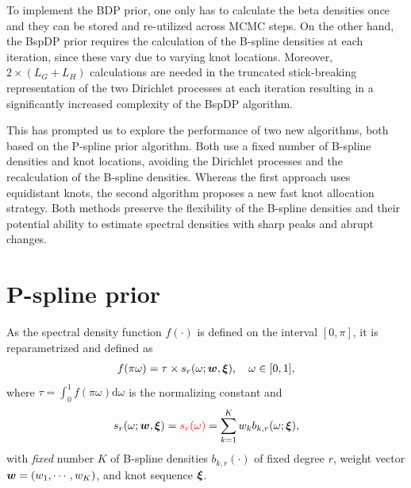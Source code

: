 \documentclass[twocolumn,final]{svjour3}
\newcommand{\bm}[1]{\mbox{\boldmath $#1$}}
\newcommand{\pmr}{ \color{red}}
\begin{document}
To implement the BDP prior, one only has to  calculate the beta densities once and they can be stored and re-utilized across MCMC steps.  On the other hand, the BspDP prior requires the calculation of the B-spline densities at each iteration, since these vary due to varying knot locations.  Moreover,  $2\!\times\!(L_G + L_H)$ calculations are needed in the truncated stick-breaking representation of the two Dirichlet processes  at each iteration %
resulting in a significantly increased complexity of  the  BspDP algorithm.


This has prompted us to explore the performance of two new algorithms, both based on the P-spline prior algorithm. Both use a fixed number of B-spline densities and knot locations, avoiding the Dirichlet processes and the recalculation of the B-spline densities. Whereas the first approach uses  equidistant knots, the second algorithm  proposes a new fast knot allocation strategy. Both methods preserve the flexibility of the B-spline densities and their potential ability to estimate spectral densities with sharp peaks and abrupt changes.


\section{P-spline prior}

As the spectral density function $f(\cdot)$ is defined on the interval $[0,\pi]$, it is reparametrized and defined as
\begin{align*}
f(\pi \omega) =\tau \times s_r(\omega;\bm{w}, \bm{\xi}), \quad \omega \in [0,1], %
\end{align*}
where $\tau = \int_{0}^{1}f(\pi \omega)\text{d}\omega$ is the normalizing constant and
\begin{align}
s_r(\omega; \bm{w}, \bm{\xi}) = {\pmr s_r(\omega)} = \sum_{k=1}^{K} w_k b_{k,r}(\omega;\bm{\xi}),
\label{eq:ps_prior}	
\end{align}
with  {\em fixed} number $K$ of B-spline densities  $b_{k,r}(\cdot)$ of fixed degree $r$, weight vector $\bm{w}=(w_1,\cdots, w_K)$, and knot sequence $\bm{\xi}$.

\end{document}
